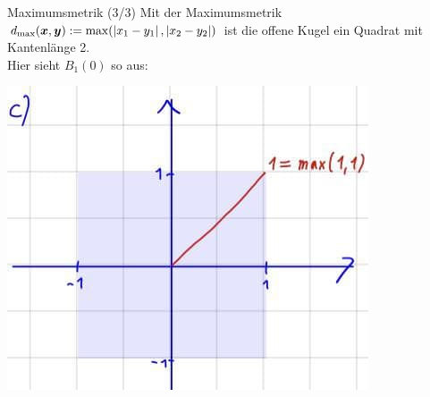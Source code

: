 \begin{Beispiel}
{Maximumsmetrik (3/3)}
Mit der Maximumsmetrik $d_{\text{max}}({{\text{\boldmath${x}$}}},{{\text{\boldmath${y}$}}}):=\max(\left|{x_1-y_1}\right|,\left|{x_2-y_2}\right|)$ ist die offene Kugel ein Quadrat mit Kantenlänge 2.\\ Hier sieht $B_1(0)$ so aus:
\begin{center}
    \includegraphics[width=.35\textwidth]{Dateien/05/05Metrik3.jpg}
\end{center}
\end{Beispiel}

